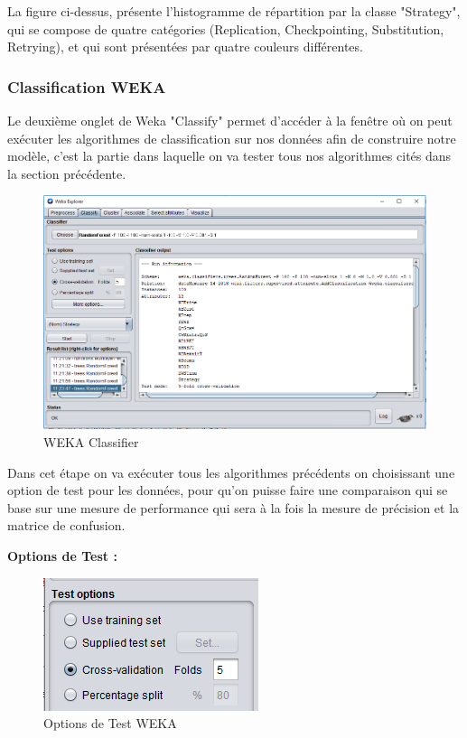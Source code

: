La figure ci-dessus, présente l'histogramme de répartition par la classe "Strategy", qui se compose de quatre catégories (Replication, Checkpointing, Substitution, Retrying), et qui sont présentées par quatre couleurs différentes. 

\subsubsection{Classification WEKA}

Le deuxième onglet de Weka "Classify" permet d'accéder à la fenêtre où on peut exécuter les algorithmes de classification sur nos données afin de construire notre modèle, c'est la partie dans laquelle on va tester tous nos algorithmes cités dans la section précédente.

\begin{figure}[H]
\begin{center}
\includegraphics[width=1\linewidth]{images/wekaClassifier.PNG}
\end{center}
\caption{WEKA Classifier}
\label{fig:12}
\end{figure}

Dans cet étape on va exécuter tous les algorithmes précédents on choisissant une option de test pour les données, pour qu'on puisse faire une comparaison qui se base sur une mesure de performance qui sera à la fois la mesure de précision et la matrice de confusion. 

\textbf{Options de Test :}


\begin{figure}[H]
\begin{center}
\includegraphics[width=0.5\linewidth]{images/TestOptions.PNG}
\end{center}
\caption{Options de Test WEKA}
\label{fig:13}
\end{figure}


